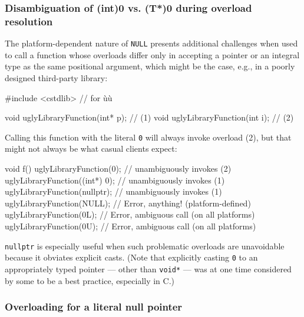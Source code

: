 \subsubsection[Disambiguation of \lstinline!(int)0! vs. \lstinline!(T*)0! during overload resolution]{Disambiguation of {\SubsubsecCode (int)0} vs. {\SubsubsecCode (T*)0} during overload resolution}\label{disambiguation-of-(int)-0-versus-(t*)-0-during-overload-resolution}

The platform-dependent nature of \lstinline!NULL! presents additional
challenges when used to call a function whose overloads differ only in
accepting a pointer or an integral type as the same positional argument, which might be the case, e.g., in a poorly designed third-party
library:

\begin{emcppshiddenlisting}[emcppsbatch=e3]
#include <cstdlib>  // for ù{}ù
\end{emcppshiddenlisting}
\begin{emcppslisting}[emcppsbatch=e3]
void uglyLibraryFunction(int* p);  // (1)
void uglyLibraryFunction(int  i);  // (2)
\end{emcppslisting}


\noindent Calling this function with the literal \lstinline!0! will always invoke
overload (2), but that might not always be what casual clients expect:

\begin{emcppslisting}[emcppsbatch=e3]
void f()
{
    uglyLibraryFunction(0);         // unambiguously invokes (2)
    uglyLibraryFunction((int*) 0);  // unambiguously invokes (1)
    uglyLibraryFunction(nullptr);   // unambiguously invokes (1)
    uglyLibraryFunction(NULL);      // Error, anything! (platform-defined)
    uglyLibraryFunction(0L);        // Error, ambiguous call (on all platforms)
    uglyLibraryFunction(0U);        // Error, ambiguous call (on all platforms)
}
\end{emcppslisting}


\noindent\lstinline!nullptr! is especially useful when such problematic overloads
are unavoidable because it obviates explicit
casts. (Note that explicitly casting \lstinline!0! to an
appropriately typed pointer --- other than \lstinline!void*! --- was at one
  time considered by some to be a best practice, especially in C.)

\subsubsection[Overloading for a literal null pointer]{Overloading for a literal null pointer}\label{overloading-for-a-literal-null-pointer}

